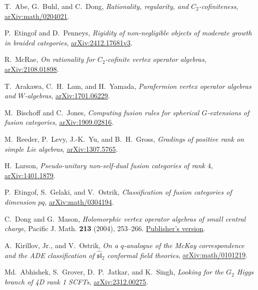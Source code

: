 
T.~Abe, G.~Buhl, and C.~Dong,
\emph{Rationality, regularity, and $C_2$-cofiniteness},
\href{https://arxiv.org/abs/math/0204021}{arXiv:math/0204021}.

P.~Etingof and D.~Penneys,
\emph{Rigidity of non-negligible objects of moderate growth in braided categories},
\href{https://arxiv.org/abs/2412.17681v3}{arXiv:2412.17681v3}.

R.~McRae,
\emph{On rationality for $C_2$-cofinite vertex operator algebras},
\href{https://arxiv.org/abs/2108.01898}{arXiv:2108.01898}.

T.~Arakawa, C.~H.~Lam, and H.~Yamada,
\emph{Parafermion vertex operator algebras and $W$-algebras},
\href{https://arxiv.org/abs/1701.06229}{arXiv:1701.06229}.

M.~Bischoff and C.~Jones,
\emph{Computing fusion rules for spherical $G$-extensions of fusion categories},
\href{https://arxiv.org/abs/1909.02816}{arXiv:1909.02816}.

M.~Reeder, P.~Levy, J.-K.~Yu, and B.~H.~Gross,
\emph{Gradings of positive rank on simple Lie algebras},
\href{https://arxiv.org/abs/1307.5765}{arXiv:1307.5765}.

H.~Larson,
\emph{Pseudo-unitary non-self-dual fusion categories of rank $4$},
\href{https://arxiv.org/abs/1401.1879}{arXiv:1401.1879}.

P.~Etingof, S.~Gelaki, and V.~Ostrik,
\emph{Classification of fusion categories of dimension $pq$},
\href{https://arxiv.org/abs/math/0304194}{arXiv:math/0304194}.

C.~Dong and G.~Mason,
\emph{Holomorphic vertex operator algebras of small central charge},
Pacific J. Math. \textbf{213} (2004), 253--266.
\href{https://msp.org/pjm/2004/213-2/pjm-v213-n2-p05-p.pdf}{Publisher's version}.

A.~Kirillov, Jr., and V.~Ostrik,
\emph{On a $q$-analogue of the McKay correspondence and the ADE classification
of $\widehat{\mathfrak{sl}}_2$ conformal field theories},
\href{https://arxiv.org/abs/math/0101219}{arXiv:math/0101219}.

Md.~Abhishek, S.~Grover, D.~P.~Jatkar, and K.~Singh,
\emph{Looking for the $G_2$ Higgs branch of 4D rank 1 SCFTs},
\href{https://arxiv.org/abs/2312.00275}{arXiv:2312.00275}.

